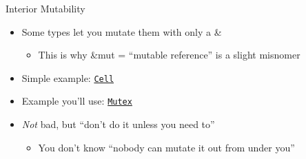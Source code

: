\documentclass[aspectratio=169, notes]{beamer}
\begin{document}
\begin{frame}{Interior Mutability}
	\begin{itemize}
	\item Some types let you mutate them with only a \textcolor{c3}{\&}
		\begin{itemize}
		\item This is why \textcolor{c3}{\&mut} = ``mutable reference'' is a slight misnomer
		\end{itemize}
	\vspace{0.2in}
	\item Simple example: \href{https://doc.rust-lang.org/std/cell/struct.Cell.html}{\texttt{Cell}}
	\vspace{0.2in}
	\item Example you'll use: \href{https://doc.rust-lang.org/std/sync/struct.Mutex.html}{\texttt{Mutex}}
	\vspace{0.2in}
	\item \emph{Not} bad, but ``don't do it unless you need to''
		\begin{itemize}
			\item You don't know ``nobody can mutate it out from under you''
		\end{itemize}
	\end{itemize}
\end{frame}
\end{document}
